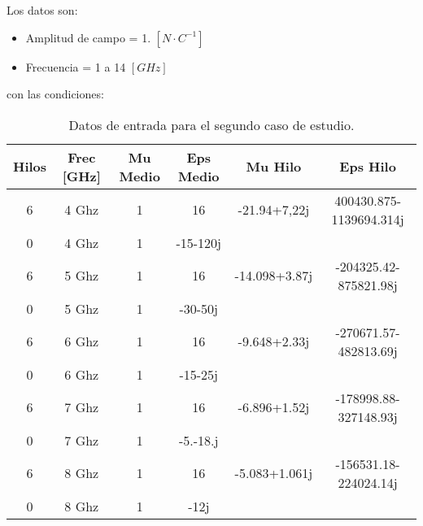 \documentclass[12pt,letterpaper]{report}
\numberwithin{equation}{section}
\begin{document}
Los datos son:

\begin{itemize}
	\item Amplitud de campo = 1. $[N \cdotp C^{-1}]$
	\item Frecuencia = 1 a 14 $[GHz]$
\end{itemize}

con las condiciones:

\begin{table}[H]
	\centering
	\caption{Datos de entrada para el segundo caso de estudio.}
	\label{tabla2}
	\begin{tabular}{@{}|c|c|c|c|c|c|@{}}
		\toprule
		\textbf{Hilos} & \textbf{Frec {[}GHz{]}} & \textbf{Mu Medio} & \textbf{Eps Medio} & \textbf{Mu Hilo}   & \textbf{Eps Hilo}       \\ \midrule
		6              & 4 Ghz                   & 1                 & 16                 & -21.94+7,22j       & 400430.875-1139694.314j \\ \midrule
		0              & 4 Ghz                   & 1                 & -15-120j           &                    &                         \\ \midrule
		6              & 5 Ghz                   & 1                 & 16                 & -14.098+3.87j      & -204325.42-875821.98j   \\ \midrule
		0              & 5 Ghz                   & 1                 & -30-50j            &                    &                         \\ \midrule
		6              & 6 Ghz                   & 1                 & 16                 & -9.648+2.33j       & -270671.57-482813.69j   \\ \midrule
		0              & 6 Ghz                   & 1                 & -15-25j            &                    &                         \\ \midrule
		6              & 7 Ghz                   & 1                 & 16                 & -6.896+1.52j       & -178998.88-327148.93j   \\ \midrule
		0              & 7 Ghz                   & 1                 & -5.-18.j           &                    &                         \\ \midrule
		6              & 8 Ghz                   & 1                 & 16                 & -5.083+1.061j      & -156531.18-224024.14j   \\ \midrule
		0              & 8 Ghz                   & 1                 & -12j               &                    &                         \\ \midrule

\end{tabular}
\end{table}
\end{document}
